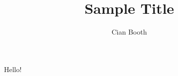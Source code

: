 \documentclass[a4paper,12pt]{article}
\author{Cian Booth}
\title{Sample Title}
\begin{document}
	\maketitle
  Hello!
\end{document}
